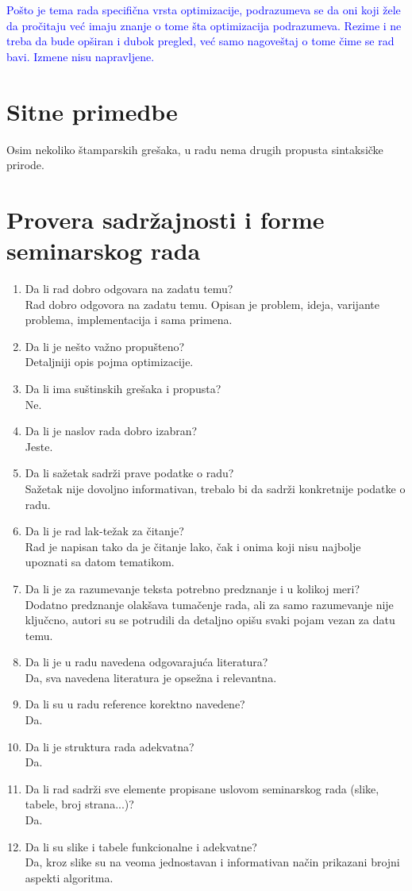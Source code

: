 \documentclass[a4paper]{report}
\newcommand{\odgovor}[1]{\textcolor{blue}{#1}}
\begin{document}
\odgovor{Pošto je tema rada specifična vrsta optimizacije, podrazumeva se da oni koji žele da pročitaju već imaju znanje o tome šta optimizacija podrazumeva. Rezime i ne treba da bude opširan i dubok pregled, već samo nagoveštaj o tome čime se rad bavi. Izmene nisu napravljene.}


\section{Sitne primedbe}
{Osim nekoliko štamparskih grešaka, u radu nema drugih propusta sintaksičke prirode.}


\section{Provera sadržajnosti i forme seminarskog rada}

\begin{enumerate}
\item Da li rad dobro odgovara na zadatu temu?\\
{Rad dobro odgovora na zadatu temu. Opisan je problem, ideja, varijante problema, implementacija i sama primena.}
\item Da li je nešto važno propušteno?\\
{Detaljniji opis pojma optimizacije.}
\item Da li ima suštinskih grešaka i propusta?\\
{Ne.}
\item Da li je naslov rada dobro izabran?\\ 
{ Jeste. }
\item Da li sažetak sadrži prave podatke o radu?\\ 
{Sažetak nije dovoljno informativan, trebalo bi da sadrži konkretnije podatke o radu. }
\item Da li je rad lak-težak za čitanje?\\ 
{Rad je napisan tako da je čitanje lako, čak i onima koji nisu najbolje upoznati sa datom tematikom.}
\item Da li je za razumevanje teksta potrebno predznanje i u kolikoj meri?\\
{Dodatno predznanje olakšava tumačenje rada, ali za samo razumevanje nije ključcno, autori su se potrudili da detaljno opišu svaki pojam vezan za datu temu.}
\item Da li je u radu navedena odgovarajuća literatura?\\ 
{Da, sva navedena literatura je opsežna i relevantna. }
\item Da li su u radu reference korektno navedene?\\ 
{Da.}
\item Da li je struktura rada adekvatna?\\
{Da.}
\item Da li rad sadrži sve elemente propisane uslovom seminarskog rada (slike, tabele, broj strana...)?\\
{Da.}
\item Da li su slike i tabele funkcionalne i adekvatne?\\
{Da, kroz slike su na veoma jednostavan i informativan način prikazani brojni aspekti algoritma.}
\end{enumerate}
\end{document}
